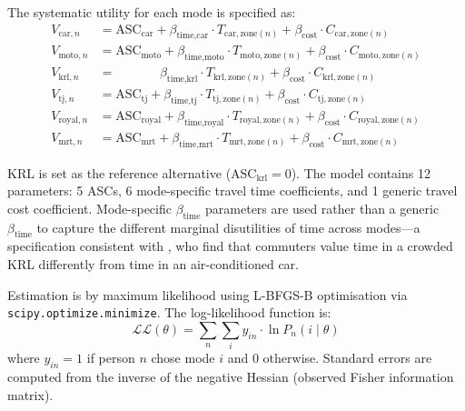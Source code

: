 \documentclass[12pt,a4paper]{article}
\begin{document}
The systematic utility for each mode is specified as:
\begin{align}
V_{\text{car},n}   &= \text{ASC}_{\text{car}}   + \beta_{\text{time,car}}   \cdot T_{\text{car},\text{zone}(n)}   + \beta_{\text{cost}} \cdot C_{\text{car},\text{zone}(n)}   \nonumber\\
V_{\text{moto},n}  &= \text{ASC}_{\text{moto}}  + \beta_{\text{time,moto}}  \cdot T_{\text{moto},\text{zone}(n)}  + \beta_{\text{cost}} \cdot C_{\text{moto},\text{zone}(n)}  \nonumber\\
V_{\text{krl},n}   &= \phantom{\text{ASC}_{\text{krl}}} \;\; \beta_{\text{time,krl}}   \cdot T_{\text{krl},\text{zone}(n)}   + \beta_{\text{cost}} \cdot C_{\text{krl},\text{zone}(n)}   \nonumber\\
V_{\text{tj},n}    &= \text{ASC}_{\text{tj}}    + \beta_{\text{time,tj}}    \cdot T_{\text{tj},\text{zone}(n)}     + \beta_{\text{cost}} \cdot C_{\text{tj},\text{zone}(n)}     \nonumber\\
V_{\text{royal},n} &= \text{ASC}_{\text{royal}} + \beta_{\text{time,royal}} \cdot T_{\text{royal},\text{zone}(n)} + \beta_{\text{cost}} \cdot C_{\text{royal},\text{zone}(n)} \nonumber\\
V_{\text{mrt},n}   &= \text{ASC}_{\text{mrt}}   + \beta_{\text{time,mrt}}   \cdot T_{\text{mrt},\text{zone}(n)}   + \beta_{\text{cost}} \cdot C_{\text{mrt},\text{zone}(n)}   \nonumber
\end{align}

KRL is set as the reference alternative ($\text{ASC}_{\text{krl}} = 0$). The model contains 12 parameters: 5 ASCs, 6 mode-specific travel time coefficients, and 1 generic travel cost coefficient. Mode-specific $\beta_{\text{time}}$ parameters are used rather than a generic $\beta_{\text{time}}$ to capture the different marginal disutilities of time across modes---a specification consistent with \citet{ilahi2021}, who find that commuters value time in a crowded KRL differently from time in an air-conditioned car.

Estimation is by maximum likelihood using L-BFGS-B optimisation via \texttt{scipy.optimize.minimize}. The log-likelihood function is:
\begin{equation}
\mathcal{L}\mathcal{L}(\theta) = \sum_n \sum_i y_{in} \cdot \ln P_n(i \mid \theta)
\label{eq:ll}
\end{equation}
where $y_{in} = 1$ if person $n$ chose mode $i$ and 0 otherwise. Standard errors are computed from the inverse of the negative Hessian (observed Fisher information matrix).
\end{document}
